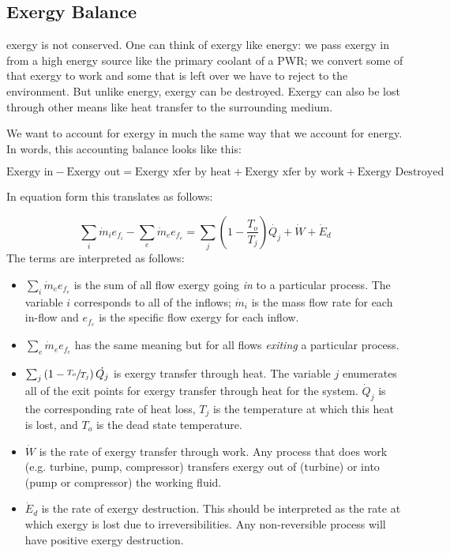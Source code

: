 \subsection{Exergy Balance}
 exergy is not conserved.  One can think of exergy like energy: we pass exergy in from a high energy source like the primary coolant of a PWR; we convert some of that exergy to work and some that is left over we have to reject to the environment.  But unlike energy, exergy can be destroyed. Exergy can also be lost through other means like heat transfer to the surrounding medium.

We want to account for exergy in much the same way that we account for energy.  In words, this accounting balance looks like this:

$$\text{Exergy in} - \text{Exergy out} = \text{Exergy xfer by heat} + \text{Exergy xfer by work} + \text{Exergy Destroyed}$$

In equation form this translates as follows:

$$\sum_i \dot{m}_i e_{f_i} - \sum_e \dot{m}_e e_{f_e} = \sum_j \left(1-\frac{T_o}{T_j} \right)\dot{Q_j}+\dot{W} + \dot{E}_d$$
The terms are interpreted as follows:
\begin{itemize}
\item $\sum_i\dot{m}_e e_{f_e}$ is the sum of all flow exergy going \emph{in} to a particular process.  The variable $i$ corresponds to all of the inflows; $\dot{m}_i$ is the mass flow rate for each in-flow and $e_{f_e}$ is the specific flow exergy for each inflow.
\item $\sum_e \dot{m}_e e_{f_e}$ has the same meaning but for all flows \emph{exiting} a particular process.
\item $\sum_j \left(1-\sfrac{T_o}{T_j} \right)\dot{Q_j}$ is exergy transfer through heat. The variable $j$ enumerates all of the exit points for exergy transfer through heat for the system. $\dot{Q}_j$ is the corresponding rate of heat loss, $T_j$ is the temperature at which this heat is lost, and $T_o$ is the dead state temperature.
\item $\dot{W}$ is the rate of exergy transfer through work.  Any process that does work (e.g. turbine, pump, compressor) transfers exergy out of (turbine) or into (pump or compressor) the working fluid.
\item $\dot{E}_d$ is the rate of exergy destruction.  This should be interpreted as the rate at which exergy is lost due to irreversibilities.  Any non-reversible process will have positive exergy destruction.
\end{itemize}




